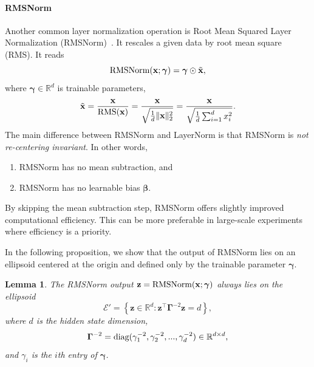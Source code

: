 \documentclass[journal]{IEEEtran}
\newcommand{\bfx}{{\bf x}}
\newcommand{\bfz}{{\bf z}}
\newcommand{\bfgamma}{{\boldsymbol \gamma}}
\newcommand{\bfGamma}{{\boldsymbol \Gamma}}
\newcommand{\bfbeta}{{\boldsymbol \beta}}
\theoremstyle{plain}
\newtheorem{lemma}[theorem]{Lemma}
\theoremstyle{definition}
\theoremstyle{remark}
\begin{document}
\paragraph{RMSNorm} Another common layer normalization operation is Root Mean Squared Layer Normalization (RMSNorm)~\cite{zhang2019root}. It rescales a given data by root mean square (RMS). It reads
\begin{equation}\label{eq:RMSNorm}
    \text{RMSNorm}(\bfx; \bfgamma) = \bfgamma \odot
    \tilde{\bfx},
\end{equation}
where $\bfgamma\in \mathbb{R}^d$ is trainable parameters,
\begin{equation}\label{eq:standardized_RMS}
    \tilde{\bfx} = \frac{\bfx}{\text{RMS}(\bfx)} = \frac{\bfx}{\sqrt{\frac{1}{d} \| \bfx \|_2^2}} = \frac{\bfx}{\sqrt{\frac{1}{d} \sum_{i=1}^d x_i^2}}.
\end{equation}
The main difference between RMSNorm and LayerNorm is that RMSNorm is \emph{not re-centering invariant}. In other words,
\begin{enumerate}
    \item RMSNorm has no mean subtraction, and
    \item RMSNorm has no learnable bias $\bfbeta$.
\end{enumerate}
By skipping the mean subtraction step, RMSNorm offers slightly improved computational efficiency. This can be more preferable in large-scale experiments where efficiency is a priority.

In the following proposition, we show that the output of RMSNorm lies on an ellipsoid centered at the origin and defined only by the trainable parameter $\bfgamma$. 

\begin{lemma}
    The RMSNorm output $\bfz = \textnormal{RMSNorm}(\bfx; \bfgamma)$  always lies on the ellipsoid
    $$
    \mathcal{E}' = \left\{ \mathbf{z} \in \mathbb{R}^d : \mathbf{z}^\top \bfGamma^{-2} \mathbf{z} = d \right\},
    $$
    where $d$ is the hidden state dimension, 
    \begin{equation}\label{eq:Sigma_diag_RMS}
    \bfGamma^{-2} = \textnormal{diag}(\gamma_1^{-2}, \gamma_2^{-2}, ..., \gamma_d^{-2}) \in \mathbb{R}^{d\times d},
    \end{equation} 
    and $\gamma_i$ is the $i$th entry of $\bfgamma$.
\end{lemma}
\end{document}
